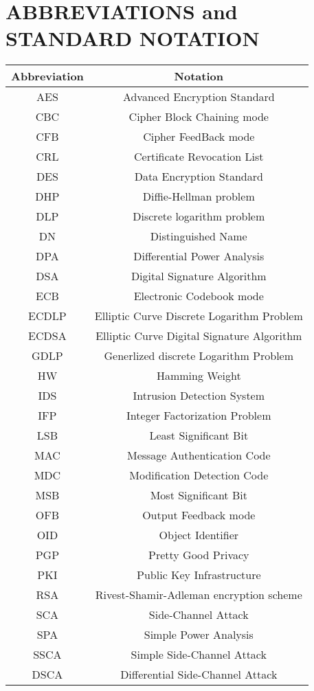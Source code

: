 \documentclass[a4paper, 10 pt, conference]{ieeeconf}
\begin{document}
\section{ABBREVIATIONS and STANDARD NOTATION}
\begin{table}[h!]
    \begin{center}
    \begin{tabularx}{\columnwidth}{c c} %
        \toprule
       Abbreviation & Notation \\
        \midrule
        AES & Advanced Encryption Standard \\
        CBC & Cipher Block Chaining mode \\
        CFB & Cipher FeedBack mode\\
        CRL & Certificate Revocation List\\
        DES & Data Encryption Standard \\
        DHP & Diffie-Hellman problem \\
        DLP & Discrete logarithm problem \\
        DN & Distinguished Name \\
        DPA & Differential Power Analysis \\
        DSA & Digital Signature Algorithm \\
        ECB & Electronic Codebook mode \\
        ECDLP & Elliptic Curve Discrete Logarithm Problem \\
        ECDSA & Elliptic Curve Digital Signature Algorithm \\
        GDLP & Generlized discrete Logarithm Problem \\
        HW & Hamming Weight \\
        IDS & Intrusion Detection System \\
        IFP & Integer Factorization Problem \\
        LSB & Least Significant Bit \\
        MAC & Message Authentication Code \\
        MDC & Modification Detection Code \\
        MSB & Most Significant Bit \\
        OFB & Output Feedback mode \\
        OID & Object Identifier \\
        PGP & Pretty Good Privacy \\
        PKI & Public Key Infrastructure \\
        RSA & Rivest-Shamir-Adleman encryption scheme \\
        SCA & Side-Channel Attack \\
        SPA & Simple Power Analysis \\
        SSCA & Simple Side-Channel Attack \\
        DSCA & Differential Side-Channel Attack \\
        \bottomrule
    \end{tabularx}
    \end{center}
\end{table}
\end{document}

